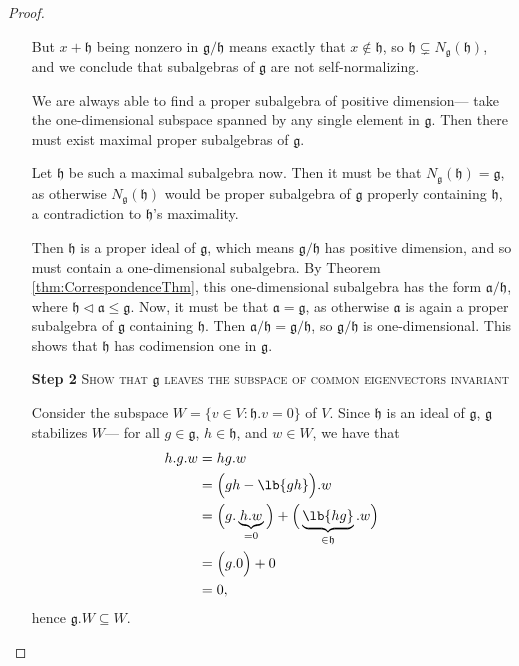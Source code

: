 \documentclass{article}
\newcommand*\tle{\ensuremath{\mathrel{\lhd}}}
\DeclarePairedDelimiter\lb\lbrack\rbrack
\newcommand*\frka{{\ensuremath{\mathfrak{a}}}}
\newcommand*\frkg{{\ensuremath{\mathfrak{g}}}}
\newcommand*\frkh{{\ensuremath{\mathfrak{h}}}}
\newcommand*\acts{.}
\begin{document}
\begin{proof}
\begin{itemize}
            But $x + \frkh$ being nonzero in $\frkg/\frkh$ means exactly that $x \notin \frkh$, so $\frkh \subsetneq N_\frkg(\frkh)$, and we conclude that subalgebras of $\frkg$ are not self-normalizing.

            We are always able to find a proper subalgebra of positive dimension--- take the one-dimensional subspace spanned by any single element in $\frkg$. 
            Then there must exist maximal proper subalgebras of $\frkg$.

            Let $\frkh$ be such a maximal subalgebra now. 
            Then it must be that $N_\frkg(\frkh) = \frkg$, as otherwise $N_\frkg(\frkh)$ would be proper subalgebra of $\frkg$ properly containing $\frkh$, a contradiction to $\frkh$'s maximality.

            Then $\frkh$ is a proper ideal of $\frkg$, which means $\frkg/\frkh$ has positive dimension, and so must contain a one-dimensional subalgebra.
            By Theorem \ref{thm:CorrespondenceThm}, this one-dimensional subalgebra has the form $\frka/\frkh$, where $\frkh \tle \frka \leq \frkg$.
            Now, it must be that $\frka = \frkg$, as otherwise $\frka$ is again a proper subalgebra of $\frkg$ containing $\frkh$.
            Then $\frka/\frkh = \frkg/\frkh$, so $\frkg/\frkh$ is one-dimensional.
            This shows that $\frkh$ has codimension one in $\frkg$.

        \item[\textbf{Step 2}] 
            \textsc{\color{Crimson} Show that $\frkg$ leaves the subspace of common eigenvectors invariant}

            Consider the subspace $W = \{ v \in V : \frkh \acts v = 0 \}$ of $V$.
            Since $\frkh$ is an ideal of $\frkg$, $\frkg$ stabilizes $W$--- for all $g \in \frkg$, $h \in \frkh$, and $w \in W$, we have that
            \begin{align*}
                h \acts g \acts w
                &=
                hg \acts w
                \\
                &= 
                \Big(gh - \lb{gh}\Big) \acts w
                \\
                &=
                \Big( g \acts \underbrace{h \acts w}_{=0} \Big) + \Big(\underbrace{\lb{hg}}_{\in \frkh} \acts w\Big)
                \\
                &=
                \Big( g \acts 0 \Big) + 0
                \\
                &=
                0,
            \end{align*}
            hence $\frkg \acts W \subseteq W$.


\end{itemize}
\end{proof}
\end{document}
